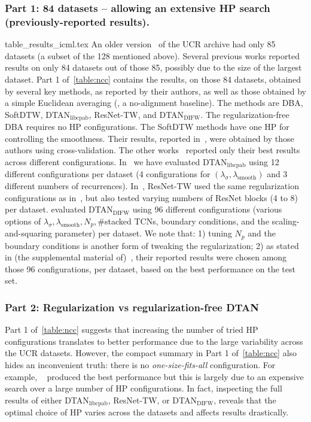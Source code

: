 \subsubsection{Part 1: 84 datasets -- allowing an extensive HP search (previously-reported results).}
{table_results_icml.tex}
An older version~\cite{Chen:UCR:Archive:2015} of the UCR archive had only 85 datasets (a subset of the 128 mentioned above). Several previous works reported results on only 84 datasets out of those 85, possibly due to the size of the largest dataset.
Part 1 of~\autoref{table:ncc} contains the results, on those 84 datasets, obtained by several key methods, as reported by their authors, as well as those obtained by a simple Euclidean averaging (\ie, a no-alignment baseline). The methods are DBA, SoftDTW, DTAN$_{\mathrm{libcpab}}$, ResNet-TW, and  DTAN$_{\mathrm{DIFW}}$. 
The regularization-free DBA requires no HP configurations. 
The SoftDTW methods have one HP for controlling the smoothness. Their results, reported in~\cite{Blondel:2021:differentiable}, were obtained by those authors using cross-validation. 
The other works~\cite{Shapira:NIPS:2019:DTAN,huang:2021:residual,Martinez:ICML:2022:closed}
reported only their best results
across different configurations. 
In~\cite{Shapira:NIPS:2019:DTAN} we have evaluated  DTAN$_\mathrm{libcpab}$ using 12 different configurations per dataset
(4 configurations for $(\lambda_{\sigma}, \lambda_{\mathrm{smooth}})$ and 3 different numbers of recurrences). In~\cite{huang:2021:residual}, ResNet-TW used the same regularization configurations
as in~\cite{Shapira:NIPS:2019:DTAN}, but also tested varying numbers of ResNet blocks (4 to 8) per dataset.
\citet{Martinez:ICML:2022:closed} evaluated  DTAN$_{\mathrm{DIFW}}$ using 96 different configurations 
(various options of $\lambda_{\sigma}, \lambda_{\mathrm{smooth}}, N_p, \#$stacked TCNs, boundary conditions, and the scaling-and-squaring parameter) per dataset. 
We note that: 1) tuning $N_p$ and the boundary conditions is another form of tweaking
the regularization; 2) as stated in (the supplemental material of)~\cite{Martinez:ICML:2022:closed}, their reported results were chosen among those 96 configurations, per dataset, based on the best performance on the test set.

\subsubsection{Part 2: Regularization vs regularization-free DTAN}
Part 1 of~\autoref{table:ncc} suggests that increasing the number of tried HP configurations translates to better performance due to the large variability across the UCR datasets. 
However, the compact summary in Part 1 of~\autoref{table:ncc} also hides an inconvenient truth:
there is no \emph{one-size-fits-all} configuration. For example, ~\citet{Martinez:ICML:2022:closed} produced the best performance but this is largely due to an expensive search over a large number of HP configurations.
In fact, inspecting the full results of either DTAN$_{\mathrm{libcpab}}$, ResNet-TW, or DTAN$_{\mathrm{DIFW}}$, reveals that 
the optimal choice of HP varies across the datasets and affects results drastically.  

